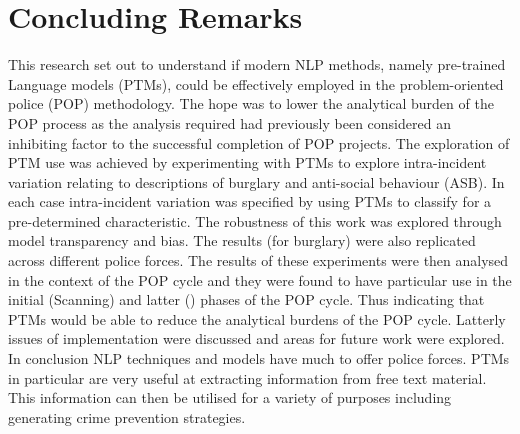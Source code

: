 \section{Concluding Remarks} This research set out to understand if modern NLP methods, namely pre-trained Language models (PTMs), could be effectively employed in the problem-oriented police (POP) methodology. The hope was to lower the analytical burden of the POP process as the analysis required had previously been considered an inhibiting factor to the successful completion of POP projects.  The exploration of PTM use was achieved by experimenting with PTMs to explore intra-incident variation relating to descriptions of burglary and anti-social behaviour (ASB). In each case intra-incident variation was specified by using PTMs to classify for a pre-determined characteristic. The robustness of this work was explored through model transparency and bias. The results (for burglary) were also replicated across different police forces. The results of these experiments were then analysed in the context of the POP cycle and they were found to have particular use in the initial (Scanning) and latter () phases of the POP cycle. Thus indicating that PTMs would be able to reduce the analytical burdens of the POP cycle. Latterly issues of implementation were discussed and areas for future work were explored.  In conclusion NLP techniques and models have much to offer police forces. PTMs in particular are very useful at extracting information from free text material. This information can then be utilised for a variety of purposes including generating crime prevention strategies. 






